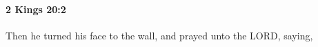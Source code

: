 
		\paragraph{2 Kings 20:2} %
			\label{2KINGS-20-2}

			Then he turned his face to the wall, and prayed unto the LORD, saying,


